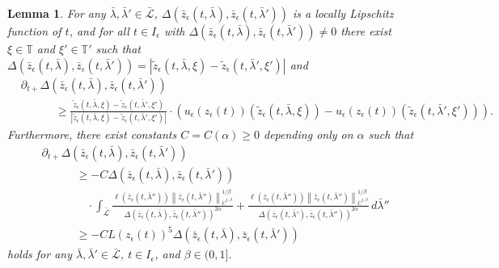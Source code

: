 \documentclass[reqno,centertags,12pt]{amsart}
\newtheorem{lemma}[theorem]{Lemma}
\theoremstyle{definition}
\numberwithin{equation}{section}
\newcommand{\abs}[1]{\left\lvert#1\right\rvert}
\newcommand{\norm}[1]{\left\|#1\right\|}
\newcommand{\bbT}{{\mathbb{T}}}
\begin{document}
\begin{lemma}\label{L6.11}
    For any $\bar{\lambda},\bar{\lambda}'\in\bar{\mathcal{L}}$,
    $\Delta(\bar{z}_{\epsilon}(t,\bar{\lambda}),\bar{z}_{\epsilon}(t,\bar{\lambda}'))$
    is a locally Lipschitz function of $t$, and for all $t\in I_{\epsilon}$ with
    $\Delta(\bar{z}_{\epsilon}(t,\bar{\lambda}),
    \bar{z}_{\epsilon}(t,\bar{\lambda}')) \neq 0$
    there exist $\xi\in\bbT$ and $\xi'\in\bbT'$ such that
    $\Delta(\bar{z}_{\epsilon}(t,\bar{\lambda}),
    \bar{z}_{\epsilon}(t,\bar{\lambda}'))
    = \abs{\tilde{z}_{\epsilon}(t,\bar{\lambda},\xi)
    - \tilde{z}_{\epsilon}(t,\bar{\lambda}',\xi')}$ and
    \begin{equation}\label{6.3}
    \begin{aligned}
        &\partial_{t+}
        \Delta(\bar{z}_{\epsilon}(t,\bar{\lambda}),\bar{z}_{\epsilon}(t,\bar{\lambda}'))
        \\&\quad\quad\quad\geq
        \frac{\tilde{z}_{\epsilon}(t,\bar{\lambda},\xi)
        - \tilde{z}_{\epsilon}(t,\bar{\lambda}',\xi')}
        {\abs{\tilde{z}_{\epsilon}(t,\bar{\lambda},\xi)
        - \tilde{z}_{\epsilon}(t,\bar{\lambda}',\xi')}}
        \cdot \left(
            u_{\epsilon}(z_{\epsilon}(t))
            \left(\tilde{z}_{\epsilon}(t,\bar{\lambda},\xi)\right)
            - u_{\epsilon}(z_{\epsilon}(t))
            \left(\tilde{z}_{\epsilon}(t,\bar{\lambda}',\xi')\right)
        \right).
    \end{aligned}
    \end{equation}
    Furthermore, there exist constants $C=C(\alpha)\geq 0$ depending only on
    $\alpha$ such that
    \begin{equation}\label{6.4}
    \begin{aligned}
        &\partial_{t+}
        \Delta(\bar{z}_{\epsilon}(t,\bar{\lambda}),\bar{z}_{\epsilon}(t,\bar{\lambda}'))
        \\&\quad\quad\quad\geq
        -C\Delta(\bar{z}_{\epsilon}(t,\bar{\lambda}),\bar{z}_{\epsilon}(t,\bar{\lambda}'))
        \\&\quad\quad\quad\quad\cdot
        \int_{\bar{\mathcal{L}}}
        \frac{\ell(\bar{z}_{\epsilon}(t,\bar{\lambda}''))
        \norm{\bar{z}_{\epsilon}(t,\bar{\lambda}'')}_{\dot{C}^{1,\beta}}^{1/\beta}}
        {\Delta(\bar{z}_{\epsilon}(t,\bar{\lambda}),
        \bar{z}_{\epsilon}(t,\bar{\lambda}''))^{2\alpha}}
        + \frac{\ell(\bar{z}_{\epsilon}(t,\bar{\lambda}''))
        \norm{\bar{z}_{\epsilon}(t,\bar{\lambda}'')}_{\dot{C}^{1,\beta}}^{1/\beta}}
        {\Delta(\bar{z}_{\epsilon}(t,\bar{\lambda}'),
        \bar{z}_{\epsilon}(t,\bar{\lambda}''))^{2\alpha}}
        \,d\bar{\lambda}''
        \\&\quad\quad\quad\geq
        -CL(z_{\epsilon}(t))^{5}
        \Delta(\bar{z}_{\epsilon}(t,\bar{\lambda}),\bar{z}_{\epsilon}(t,\bar{\lambda}'))
    \end{aligned}
    \end{equation}
    holds for any $\bar{\lambda},\bar{\lambda}'\in\bar{\mathcal{L}}$,
    $t\in I_{\epsilon}$, and $\beta\in(0,1]$.
\end{lemma}
\end{document}
